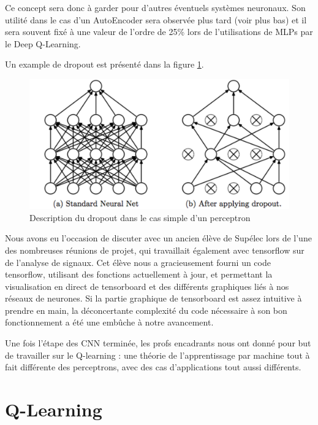\documentclass[
    10pt,
    a4paper,
    oneside,
    headinclude,footinclude,
    BCOR=5mm,
    captions=tableabove
]{scrartcl}
\begin{document}
Ce concept sera donc à garder pour d'autres éventuels systèmes neuronaux. Son utilité dans le cas d'un AutoEncoder sera observée plus tard (voir plus bas) et il sera souvent fixé à une valeur de l'ordre de 25\% lors de l'utilisations de MLPs par le Deep Q-Learning.

Un example de dropout est présenté dans la figure \ref{fig:dropout.PNG}.
\begin{figure}[h!]
\includegraphics[width=\linewidth]{dropout.PNG}
\centering
\caption{Description du dropout dans le cas simple d'un perceptron}
\label{fig:dropout.PNG}
\end{figure}

\newpage
Nous avons eu l'occasion de discuter avec un ancien élève de Supélec lors de l'une des nombreuses réunions de projet, qui travaillait également avec tensorflow sur de l'analyse de signaux. Cet élève nous a gracieusement fourni un code tensorflow, utilisant des fonctions actuellement à jour, et permettant la visualisation en direct de tensorboard et des différents graphiques liés à nos réseaux de neurones. Si la partie graphique de tensorboard est assez intuitive à prendre en main, la déconcertante complexité du code nécessaire à son bon fonctionnement a été une embûche à notre avancement.

Une fois l'étape des CNN terminée, les profs encadrants nous ont donné pour but de travailler sur le Q-learning : une théorie de l'apprentissage par machine tout à fait différente des perceptrons, avec des cas d'applications tout aussi différents.

\newpage
\section{Q-Learning}
\end{document}
